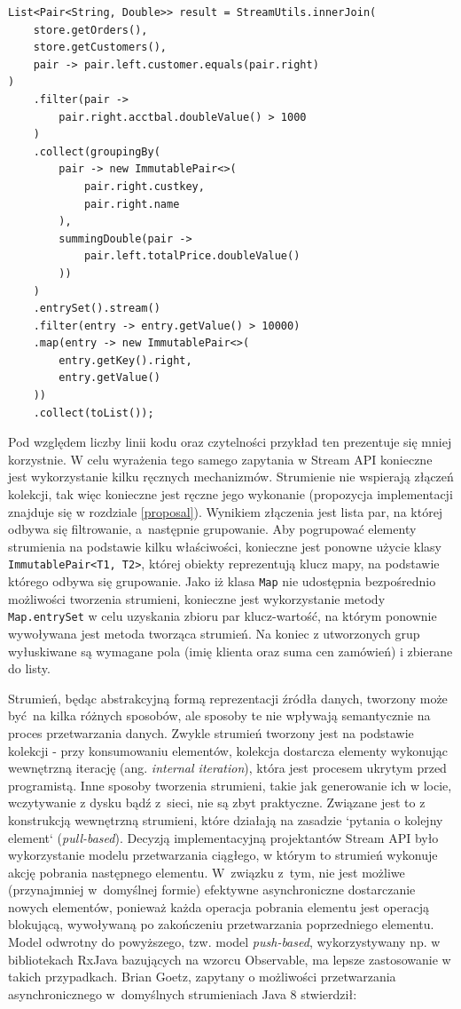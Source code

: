 \documentclass[12pt,twoside,openright]{extarticle}
\begin{document}
\begin{lstlisting}[label=streamsexample, caption=Analogiczne rozwiązanie wykorzystujące Stream API]
List<Pair<String, Double>> result = StreamUtils.innerJoin(
    store.getOrders(),
    store.getCustomers(),
    pair -> pair.left.customer.equals(pair.right)
)
    .filter(pair ->
        pair.right.acctbal.doubleValue() > 1000
    )
    .collect(groupingBy(
        pair -> new ImmutablePair<>(
            pair.right.custkey,
            pair.right.name
        ),
        summingDouble(pair ->
            pair.left.totalPrice.doubleValue()
        ))
    )
    .entrySet().stream()
    .filter(entry -> entry.getValue() > 10000)
    .map(entry -> new ImmutablePair<>(
        entry.getKey().right,
        entry.getValue()
    ))
    .collect(toList());
\end{lstlisting}

    Pod względem liczby linii kodu oraz czytelności przykład ten prezentuje się mniej korzystnie. W celu wyrażenia tego samego zapytania w Stream API konieczne jest wykorzystanie kilku ręcznych mechanizmów. Strumienie nie wspierają złączeń kolekcji, tak więc konieczne jest ręczne jego wykonanie (propozycja implementacji znajduje się w rozdziale \ref{proposal}). Wynikiem złączenia jest lista par, na której odbywa się filtrowanie, a~następnie grupowanie. Aby pogrupować elementy strumienia na podstawie kilku właściwości, konieczne jest ponowne użycie klasy \texttt{ImmutablePair<T1, T2>}, której obiekty reprezentują klucz mapy, na podstawie którego odbywa się grupowanie. Jako iż klasa \texttt{Map} nie udostępnia bezpośrednio możliwości tworzenia strumieni, konieczne jest wykorzystanie metody \texttt{Map.entrySet} w celu uzyskania zbioru par klucz-wartość, na którym ponownie wywoływana jest metoda tworząca strumień. Na koniec z utworzonych grup wyłuskiwane są wymagane pola (imię klienta oraz suma cen zamówień) i zbierane do listy.

    Strumień, będąc abstrakcyjną formą reprezentacji źródła danych, tworzony może być na kilka różnych sposobów, ale sposoby te nie wpływają semantycznie na proces przetwarzania danych. Zwykle strumień tworzony jest na podstawie kolekcji - przy konsumowaniu elementów, kolekcja dostarcza elementy wykonując wewnętrzną iterację (ang. \textit{internal iteration}), która jest procesem ukrytym przed programistą. Inne sposoby tworzenia strumieni, takie jak generowanie ich w locie, wczytywanie z dysku bądź z~sieci, nie są zbyt praktyczne. Związane jest to z konstrukcją wewnętrzną strumieni, które działają na zasadzie `pytania o kolejny element` (\textit{pull-based}). Decyzją implementacyjną projektantów Stream API było wykorzystanie modelu przetwarzania ciągłego, w którym to strumień wykonuje akcję pobrania następnego elementu. W~związku z~tym, nie jest możliwe (przynajmniej w~domyślnej formie) efektywne asynchroniczne dostarczanie nowych elementów, ponieważ każda operacja pobrania elementu jest operacją blokującą, wywoływaną po zakończeniu przetwarzania poprzedniego elementu. Model odwrotny do powyższego, tzw. model \textit{push-based}, wykorzystywany np. w bibliotekach RxJava bazujących na wzorcu Observable, ma lepsze zastosowanie w takich przypadkach. Brian Goetz, zapytany o możliwości przetwarzania asynchronicznego w~domyślnych strumieniach Java 8 stwierdził:
\end{document}
